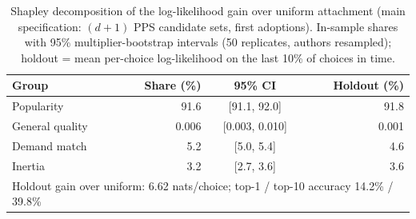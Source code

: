 \begin{table}[t]
\centering
\caption{Shapley decomposition of the log-likelihood gain over uniform attachment (main specification: $(d{+}1)$ PPS candidate sets, first adoptions). In-sample shares with 95\% multiplier-bootstrap intervals (50 replicates, authors resampled); holdout = mean per-choice log-likelihood on the last 10\% of choices in time.}
\label{tab:shapley}
\small
\begin{tabular}{lrcr}
\toprule
Group & Share (\%) & 95\% CI & Holdout (\%) \\
\midrule
Popularity & 91.6 & [91.1, 92.0] & 91.8 \\
General quality & 0.006 & [0.003, 0.010] & 0.001 \\
Demand match & 5.2 & [5.0, 5.4] & 4.6 \\
Inertia & 3.2 & [2.7, 3.6] & 3.6 \\
\midrule
\multicolumn{4}{l}{Holdout gain over uniform: 6.62 nats/choice; top-1 / top-10 accuracy 14.2\% / 39.8\%} \\
\bottomrule
\end{tabular}
\end{table}

